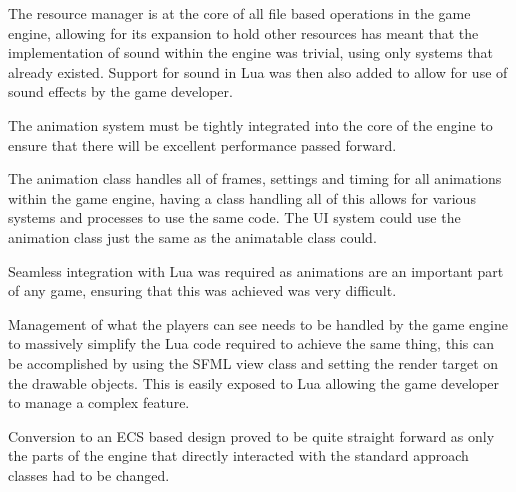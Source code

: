\documentclass[11pt,a4paper,titlepage]{report}
\begin{document}

    The resource manager is at the core of all file based operations in the game engine, allowing for its expansion to hold other resources has meant that the implementation of sound within the engine was trivial, using only systems that already existed. Support for sound in Lua was then also added to allow for use of sound effects by the game developer.


    The animation system must be tightly integrated into the core of the engine to ensure that there will be excellent performance passed forward.

    The animation class handles all of frames, settings and timing for all animations within the game engine, having a class handling all of this allows for various systems and processes to use the same code. The UI system could use the animation class just the same as the animatable class could.

    Seamless integration with Lua was required as animations are an important part of any game, ensuring that this was achieved was very difficult.


    Management of what the players can see needs to be handled by the game engine to massively simplify the Lua code required to achieve the same thing, this can be accomplished by using the SFML view class and setting the render target on the drawable objects. This is easily exposed to Lua allowing the game developer to manage a complex feature.





    Conversion to an ECS based design proved to be quite straight forward as only the parts of the engine that directly interacted with the standard approach classes had to be changed.

\end{document}
